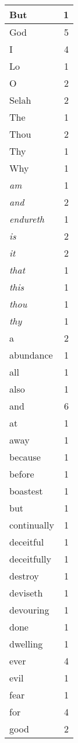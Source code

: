 \begin{center}
\begin{longtable}{l|r}
\hline \hline
\endlastfoot
But & 1 \\ \hline
God & 5 \\ \hline
I & 4 \\ \hline
Lo & 1 \\ \hline
O & 2 \\ \hline
Selah & 2 \\ \hline
The & 1 \\ \hline
Thou & 2 \\ \hline
Thy & 1 \\ \hline
Why & 1 \\ \hline
\emph{am} & 1 \\ \hline
\emph{and} & 2 \\ \hline
\emph{endureth} & 1 \\ \hline
\emph{is} & 2 \\ \hline
\emph{it} & 2 \\ \hline
\emph{that} & 1 \\ \hline
\emph{this} & 1 \\ \hline
\emph{thou} & 1 \\ \hline
\emph{thy} & 1 \\ \hline
a & 2 \\ \hline
abundance & 1 \\ \hline
all & 1 \\ \hline
also & 1 \\ \hline
and & 6 \\ \hline
at & 1 \\ \hline
away & 1 \\ \hline
because & 1 \\ \hline
before & 1 \\ \hline
boastest & 1 \\ \hline
but & 1 \\ \hline
continually & 1 \\ \hline
deceitful & 1 \\ \hline
deceitfully & 1 \\ \hline
destroy & 1 \\ \hline
deviseth & 1 \\ \hline
devouring & 1 \\ \hline
done & 1 \\ \hline
dwelling & 1 \\ \hline
ever & 4 \\ \hline
evil & 1 \\ \hline
fear & 1 \\ \hline
for & 4 \\ \hline
good & 2 \\ \hline

\end{longtable}
\end{center}
